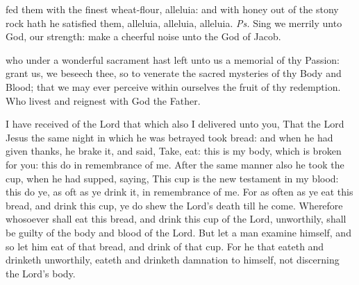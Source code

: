 \introit
{} fed them with the finest wheat-flour, alleluia: and with honey out of the stony rock hath he satisfied them, alleluia, alleluia, alleluia. \textit{Ps.} Sing we merrily unto God, our strength: make a cheerful noise unto the God of Jacob.

\vspace{-0.25\baselineskip}

\collect
{} who under a wonderful sacrament hast left unto us a memorial of thy Passion: grant us, we beseech thee, so to venerate the sacred mysteries of thy Body and Blood; that we may ever perceive within ourselves the fruit of thy redemption. Who livest and reignest with God the Father.

 I have received of the Lord that which also I delivered unto you, That the Lord Jesus the same night in which he was betrayed took bread: and when he had given thanks, he brake it, and said, Take, eat: this is my body, which is broken for you: this do in remembrance of me. After the same manner also he took the cup, when he had supped, saying, This cup is the new testament in my blood: this do ye, as oft as ye drink it, in remembrance of me. For as often as ye eat this bread, and drink this cup, ye do shew the Lord's death till he come. Wherefore whosoever shall eat this bread, and drink this cup of the Lord, unworthily, shall be guilty of the body and blood of the Lord. But let a man examine himself, and so let him eat of that bread, and drink of that cup. For he that eateth and drinketh unworthily, eateth and drinketh damnation to himself, not discerning the Lord's body.



